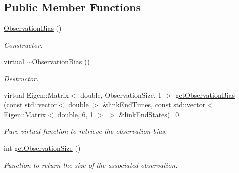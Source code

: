 \subsection*{Public Member Functions}
\begin{DoxyCompactItemize}
\item 
\hyperlink{classtudat_1_1observation__models_1_1ObservationBias_a31ad7d28d9b81c4c0df65fd47e39f3ea}{Observation\+Bias} ()\hypertarget{classtudat_1_1observation__models_1_1ObservationBias_a31ad7d28d9b81c4c0df65fd47e39f3ea}{}\label{classtudat_1_1observation__models_1_1ObservationBias_a31ad7d28d9b81c4c0df65fd47e39f3ea}

\begin{DoxyCompactList}\small\item\em Constructor. \end{DoxyCompactList}\item 
virtual \hyperlink{classtudat_1_1observation__models_1_1ObservationBias_a5e9f892808937f518b7398f6cfcd19de}{$\sim$\+Observation\+Bias} ()\hypertarget{classtudat_1_1observation__models_1_1ObservationBias_a5e9f892808937f518b7398f6cfcd19de}{}\label{classtudat_1_1observation__models_1_1ObservationBias_a5e9f892808937f518b7398f6cfcd19de}

\begin{DoxyCompactList}\small\item\em Destructor. \end{DoxyCompactList}\item 
virtual Eigen\+::\+Matrix$<$ double, Observation\+Size, 1 $>$ \hyperlink{classtudat_1_1observation__models_1_1ObservationBias_a58e9f9e041804d67b69a478e4ed855c1}{get\+Observation\+Bias} (const std\+::vector$<$ double $>$ \&link\+End\+Times, const std\+::vector$<$ Eigen\+::\+Matrix$<$ double, 6, 1 $>$ $>$ \&link\+End\+States)=0
\begin{DoxyCompactList}\small\item\em Pure virtual function to retrieve the observation bias. \end{DoxyCompactList}\item 
int \hyperlink{classtudat_1_1observation__models_1_1ObservationBias_adaa0258566dfe1e9438afbcfb57ccddb}{get\+Observation\+Size} ()
\begin{DoxyCompactList}\small\item\em Function to return the size of the associated observation. \end{DoxyCompactList}\end{DoxyCompactItemize}


